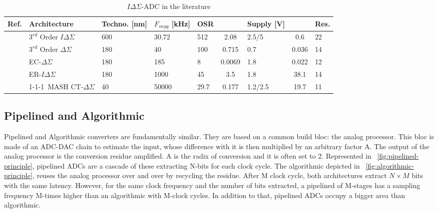 \begin{table}[htp]
	\caption{\(I\Delta\Sigma \)-ADC in the literature}
	\centering
	\label{table:sigma_delta_comparison_table}
	\begin{tabular}{L{3.5\charwidth} R{16.5\charwidth} R{6\charwidth} C{5\charwidth} R{4\charwidth} S[table-format=2.2, table-column-width=6\charwidth] R{6\charwidth} S[table-format=2.2, table-column-width=6\charwidth] C{3.5\charwidth}}
	\toprule
	Ref. & Architecture & Techno. [nm] & \(F_{snyq}\) [kHz] & OSR & {} & Supply [V] & {} & Res. \\ 
	\midrule
	\cite{Quiquempoix2006} & \(3^{rd}\) Order \(I\Delta\Sigma \) & 600 & 30.72 & 512 & 2.08 & 2.5/5 & 0.6 & 22 \\
	\cite{Chae2009} & \(3^{rd}\) Order \(\Delta\Sigma \) & 180 & 40 & 100 & 0.715 & 0.7 & 0.036 & 14 \\
	\cite{Jeon2017} & EC-\(\Delta\Sigma \) & 180 & 185 & 8 & 0.0069 & 1.8 & 0.022 & 12 \\
	\cite{Agah2010} & ER-\(I\Delta\Sigma \) & 180 & 1000 & 45 & 3.5 & 1.8 & 38.1 & 14 \\
	\cite{Liu2017} & 1-1-1~MASH CT-\(\Delta\Sigma \) & 40 & 50000 & 29.7 & 0.177 & 1.2/2.5 & 19.7 & 11 \\
	\bottomrule
	\end{tabular}
\end{table}

\subsection{Pipelined and Algorithmic}               %
\label{sec:pipe-adc}
Pipelined and Algorithmic converters are fundamentally similar. They are based on a common build bloc: the analog processor. This bloc is made of an ADC-DAC chain to estimate the input, whose difference with it is then multiplied by an arbitrary factor A. The output of the analog processor is the conversion residue amplified. A is the radix of conversion and it is often set to 2. Represented in \figurename~\ref{fig:pipelined-principle}, pipelined ADCs are a cascade of these extracting N-bits for each clock cycle. The algorithmic depicted in \figurename~\ref{fig:algorithmic-principle}, reuses the analog processor over and over by recycling the residue. After M clock cycle, both architectures extract $N\times M$ bits with the same latency. However, for the same clock frequency and the number of bits extracted, a pipelined of M-stages has a sampling frequency M-times higher than an algorithmic with M-clock cycles. In addition to that, pipelined ADCs occupy a bigger area than algorithmic.


